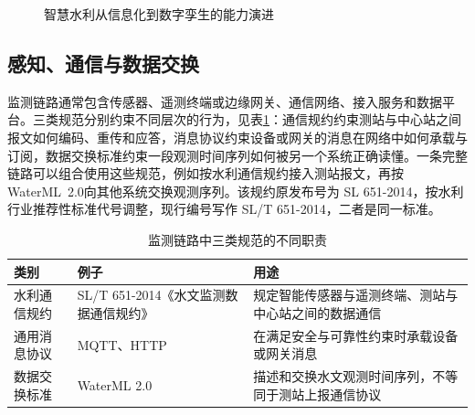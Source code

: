 \begin{figure}[htbp]
\centering
{}
\caption{智慧水利从信息化到数字孪生的能力演进}
\label{fig:ch01-evolution}
\end{figure}

\subsection{感知、通信与数据交换}

监测链路通常包含传感器、遥测终端或边缘网关、通信网络、接入服务和数据平台。三类规范分别约束不同层次的行为，见表\ref{tab:monitoring-protocol-roles}：通信规约约束测站与中心站之间报文如何编码、重传和应答，消息协议约束设备或网关的消息在网络中如何承载与订阅，数据交换标准约束一段观测时间序列如何被另一个系统正确读懂。一条完整链路可以组合使用这些规范，例如按水利通信规约接入测站报文，再按WaterML~2.0向其他系统交换观测序列。该规约原发布号为 SL 651-2014，按水利行业推荐性标准代号调整，现行编号写作 SL/T 651-2014，二者是同一标准。

\begin{table}[htbp]
\centering
\caption{监测链路中三类规范的不同职责}
\label{tab:monitoring-protocol-roles}
\begin{tabular}{p{2.4cm}p{4.5cm}p{5.7cm}}
\toprule
类别 & 例子 & 用途 \\
\midrule
水利通信规约 & SL/T 651-2014《水文监测数据通信规约》 & 规定智能传感器与遥测终端、测站与中心站之间的数据通信\cite{slt6512014} \\
通用消息协议 & MQTT、HTTP & 在满足安全与可靠性约束时承载设备或网关消息 \\
数据交换标准 & WaterML 2.0 & 描述和交换水文观测时间序列，不等同于测站上报通信协议 \\
\bottomrule
\end{tabular}
\end{table}

